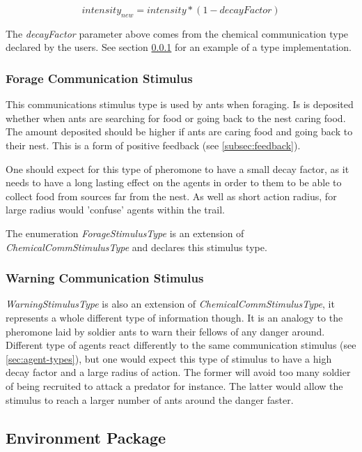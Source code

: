 \begin{equation}
intensity_{new} = intensity * (1 - decayFactor)
\end{equation}

The \emph{decayFactor} parameter above comes from the chemical communication type declared by the users. See section \ref{subsec:forage-stimulus} for an example of a type implementation.

\subsubsection {Forage Communication Stimulus}
\label{subsec:forage-stimulus}

This communications stimulus type is used by ants when foraging. Is is deposited whether when ants are searching for food or going back to the nest caring food. The amount deposited should be higher if ants are caring food and going back to their nest. This is a form of positive feedback (see \ref{subsec:feedback}).

One should expect for this type of pheromone to have a small decay factor, as it needs to have a long lasting effect on the agents in order to them to be able to collect food from sources far from the nest. As well as short action radius, for large radius would 'confuse' agents within the trail.

The enumeration \emph{ForageStimulusType} is an extension of \emph{ChemicalCommStimulusType} and declares this stimulus type.

\subsubsection {Warning Communication Stimulus}

\emph{WarningStimulusType} is also an extension of \emph{ChemicalCommStimulusType}, it represents a whole different type of information though. It is an analogy to the pheromone laid by soldier ants to warn their fellows of any danger around. Different type of agents react differently to the same communication stimulus (see \ref{sec:agent-types}), but one would expect this type of stimulus to have a high decay factor and a large radius of action. The former will avoid too many soldier of being recruited to attack a predator for instance. The latter would allow the stimulus to reach a larger number of ants around the danger faster.

\subsection{Environment Package}

